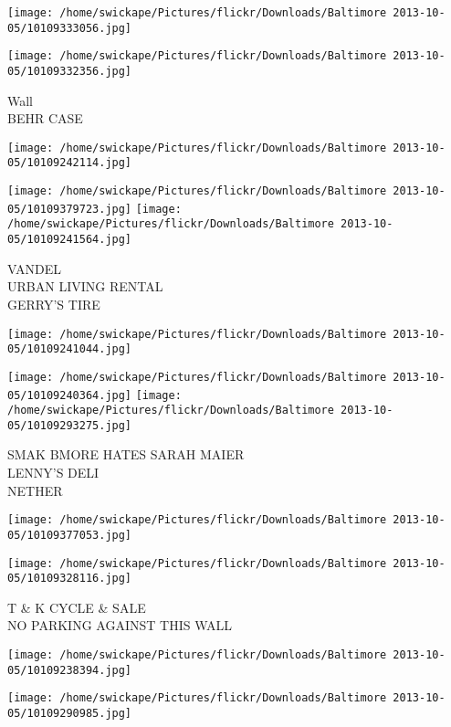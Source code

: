 \documentclass[10pt,letterpaper]{article}
\begin{document}
\texttt{[image: /home/swickape/Pictures/flickr/Downloads/Baltimore 2013-10-05/10109333056.jpg]}

\vspace{0.25in}
\texttt{[image: /home/swickape/Pictures/flickr/Downloads/Baltimore 2013-10-05/10109332356.jpg]}

Wall\\
BEHR CASE
\pagebreak

\texttt{[image: /home/swickape/Pictures/flickr/Downloads/Baltimore 2013-10-05/10109242114.jpg]}

\vspace{0.25in}
\texttt{[image: /home/swickape/Pictures/flickr/Downloads/Baltimore 2013-10-05/10109379723.jpg]}
\texttt{[image: /home/swickape/Pictures/flickr/Downloads/Baltimore 2013-10-05/10109241564.jpg]}

VANDEL\\
URBAN LIVING RENTAL\\
GERRY'S TIRE
\pagebreak

\texttt{[image: /home/swickape/Pictures/flickr/Downloads/Baltimore 2013-10-05/10109241044.jpg]}

\vspace{0.25in}
\texttt{[image: /home/swickape/Pictures/flickr/Downloads/Baltimore 2013-10-05/10109240364.jpg]}
\texttt{[image: /home/swickape/Pictures/flickr/Downloads/Baltimore 2013-10-05/10109293275.jpg]}

SMAK BMORE HATES SARAH MAIER\\
LENNY'S DELI\\
NETHER
\pagebreak

\texttt{[image: /home/swickape/Pictures/flickr/Downloads/Baltimore 2013-10-05/10109377053.jpg]}

\vspace{0.25in}
\texttt{[image: /home/swickape/Pictures/flickr/Downloads/Baltimore 2013-10-05/10109328116.jpg]}

T \& K CYCLE \& SALE\\
NO PARKING AGAINST THIS WALL
\pagebreak

\texttt{[image: /home/swickape/Pictures/flickr/Downloads/Baltimore 2013-10-05/10109238394.jpg]}

\vspace{0.25in}
\texttt{[image: /home/swickape/Pictures/flickr/Downloads/Baltimore 2013-10-05/10109290985.jpg]}
\end{document}
